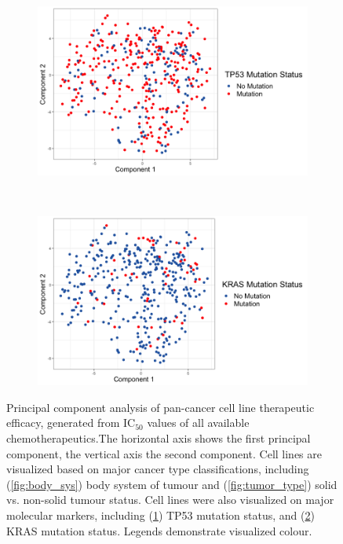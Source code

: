 \documentclass[10pt, letterpaper]{article}
\begin{document}
\begin{multicols*}{2}
\begin{figure}[!ht]
	\begin{subfigure}[t]{0.5\textwidth}
		\centering
		\includegraphics[width=\columnwidth]{Figures/pca_m/tp53.png}
		\caption{}
		\label{fig:tp53}
	\end{subfigure}%
	~
	\begin{subfigure}[t]{0.5\textwidth}
		\centering
		\includegraphics[width=\columnwidth]{Figures/pca_m/kras.png}
		\caption{}
		\label{fig:kras}
	\end{subfigure}

	\caption{Principal component analysis of pan-cancer cell line therapeutic efficacy, generated from IC$_{50}$ values of all available chemotherapeutics.The horizontal axis shows the first principal component, the vertical axis the second component. Cell lines are visualized based on major cancer type classifications, including (\ref{fig:body_sys}) body system of tumour and (\ref{fig:tumor_type}) solid vs. non-solid tumour status. Cell lines were also visualized on major molecular markers, including (\ref{fig:tp53}) TP53 mutation status, and (\ref{fig:kras}) KRAS mutation status. Legends demonstrate visualized colour.}
	\label{fig:overall_pca}
\end{figure}



\end{multicols*}
\end{document}
